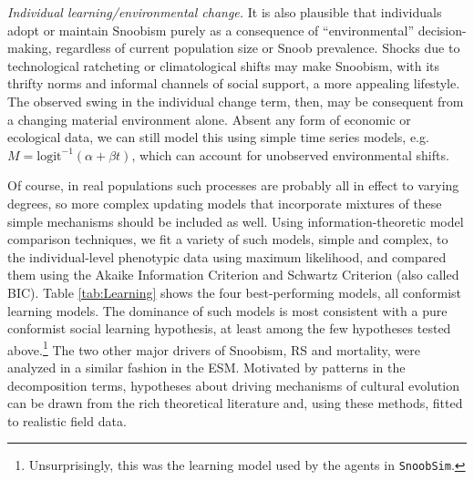 \documentclass[11pt]{article}
\begin{document}
\textit{Individual learning/environmental change.}  It is also plausible that individuals adopt or maintain Snoobism purely as a consequence of ``environmental'' decision-making, regardless of current population size or Snoob prevalence. Shocks due to technological ratcheting or climatological shifts may make Snoobism, with its thrifty norms and informal channels of social support, a more appealing lifestyle.  The observed swing in the individual change term, then, may be consequent from a changing material environment alone.  Absent any form of economic or ecological data, we can still model this using simple time series models, e.g. $M=\mathrm{logit}^{-1}(\alpha + \beta t)$, which can account for unobserved environmental shifts. 

Of course, in real populations such processes are probably all in effect to varying degrees, so more complex updating models that incorporate mixtures of these simple mechanisms should be included as well.  Using information-theoretic model comparison techniques, we fit a variety of such models, simple and complex, to the individual-level phenotypic data using maximum likelihood, and compared them using the Akaike Information Criterion and Schwartz Criterion (also called BIC).  Table \ref{tab:Learning} shows the four best-performing models, all conformist learning models.  The dominance of such models is most consistent with a pure conformist social learning hypothesis, at least among the few hypotheses tested above.\footnote{Unsurprisingly, this was the learning model used by the agents in \texttt{SnoobSim}.}  The two other major drivers of Snoobism, RS and mortality, were analyzed in a similar fashion in the ESM.  Motivated by patterns in the decomposition terms, hypotheses about driving mechanisms of cultural evolution can be drawn from the rich theoretical literature and, using these methods, fitted to realistic field data.
\end{document}
